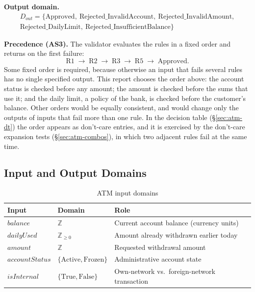 \documentclass[11pt,a4paper]{article}
\begin{document}
\textbf{Output domain.}
\begin{multline*}
D_{out}=\{\mathrm{Approved},\ \mathrm{Rejected\_InvalidAccount},\
\mathrm{Rejected\_InvalidAmount},\\
\mathrm{Rejected\_DailyLimit},\
\mathrm{Rejected\_InsufficientBalance}\}
\end{multline*}

\textbf{Precedence (AS3).} The validator evaluates the rules in a fixed
order and returns on the first failure:
\[
\text{R1} \;\to\; \text{R2} \;\to\; \text{R3} \;\to\; \text{R5}
\;\to\; \mathrm{Approved}.
\]
Some fixed order is required, because otherwise an input that fails several
rules has no single specified output. This report chooses the order above:
the account status is checked before any amount; the amount is checked
before the sums that use it; and the daily limit, a policy of the bank, is
checked before the customer's balance. Other orders would be equally
consistent, and would change only the outputs of inputs that fail more than
one rule. In the decision table (\S\ref{sec:atm-dt}) the order appears as
don't-care entries, and it is exercised by the don't-care expansion tests
(\S\ref{sec:atm-combos}), in which two adjacent rules fail at the same time.

\subsection{Input and Output Domains}
\label{sec:atm-domains}

\begin{table}[H]
\centering
\caption{ATM input domains}
\label{tab:atm-domains}
\begin{tabularx}{\textwidth}{l l Y}
\toprule
Input & Domain & Role \\
\midrule
\(\mathit{balance}\) & \(\mathbb{Z}\) & Current account balance (currency units) \\
\(\mathit{dailyUsed}\) & \(\mathbb{Z}_{\ge0}\) & Amount already withdrawn earlier today \\
\(\mathit{amount}\) & \(\mathbb{Z}\) & Requested withdrawal amount \\
\(\mathit{accountStatus}\) & \(\{\mathrm{Active},\mathrm{Frozen}\}\) & Administrative account state \\
\(\mathit{isInternal}\) & \(\{\mathrm{True},\mathrm{False}\}\) & Own-network vs.\ foreign-network transaction \\
\bottomrule
\end{tabularx}
\end{table}
\end{document}
